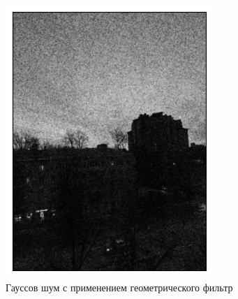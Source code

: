 \documentclass[a4paper,12pt]{article}
\begin{document}
\begin{figure}[H]
    \begin{minipage}{0.49\textwidth}
        \centering \includegraphics[width=\textwidth]{results/lpf_gaus_2.png}
        \caption{Гауссов шум с применением геометрического фильтр}
    \end{minipage}\hfill
    \begin{minipage}{0.49\textwidth}

\end{minipage}
\end{figure}
\end{document}
